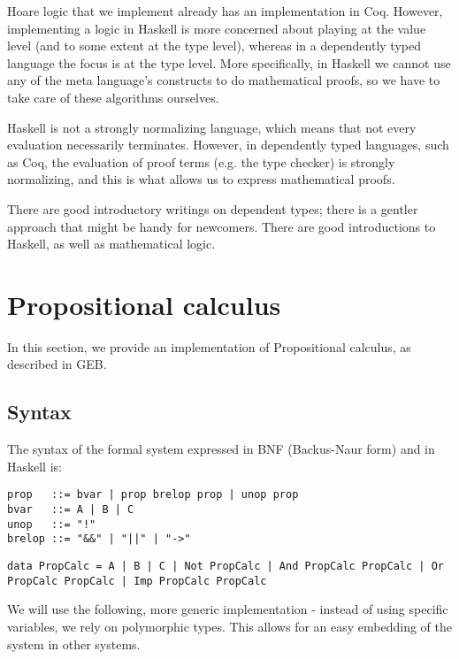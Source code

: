 \documentclass{article}
\begin{document}
Hoare logic that we implement already has an implementation in Coq\cite{b3}. However, implementing a logic in Haskell is more concerned about playing at the value level (and to some extent at the type level), whereas in a dependently typed language the focus is at the type level. More specifically, in Haskell we cannot use any of the meta language's constructs to do mathematical proofs, so we have to take care of these algorithms ourselves.

Haskell is not a strongly normalizing language, which means that not every evaluation necessarily terminates. However, in dependently typed languages, such as Coq, the evaluation of proof terms (e.g. the type checker) is strongly normalizing, and this is what allows us to express mathematical proofs.

There are good introductory writings on dependent types\cite{b3}; there is a gentler approach that might be handy for newcomers\cite{b4}. There are good introductions to Haskell\cite{b5}, as well as mathematical logic\cite{b6}.

\section{Propositional calculus}

In this section, we provide an implementation of Propositional calculus, as described in GEB\cite{b7}.

\subsection{Syntax}

The syntax of the formal system expressed in BNF (Backus-Naur form) and in Haskell is:

\begin{minipage}{0.49\textwidth}
\begin{lstlisting}
prop   ::= bvar | prop brelop prop | unop prop
bvar   ::= A | B | C
unop   ::= "!"
brelop ::= "&&" | "||" | "->"
\end{lstlisting}
\end{minipage}
\begin{minipage}{0.49\textwidth}
\begin{lstlisting}
data PropCalc = A | B | C | Not PropCalc | And PropCalc PropCalc | Or PropCalc PropCalc | Imp PropCalc PropCalc
\end{lstlisting}
\end{minipage}

We will use the following, more generic implementation - instead of using specific variables, we rely on polymorphic types. This allows for an easy embedding of the system in other systems.
\end{document}
